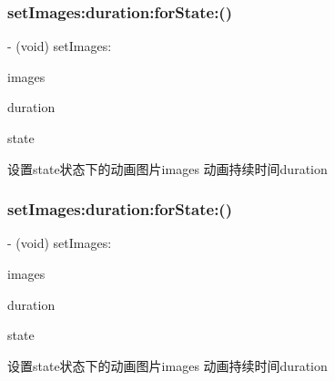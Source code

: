 \subsubsection{\texorpdfstring{set\+Images\+:duration\+:for\+State\+:()}{setImages:duration:forState:()}\hspace{0.1cm}{\footnotesize\ttfamily [1/3]}}
{\footnotesize\ttfamily -\/ (void) set\+Images\+: \begin{DoxyParamCaption}\item[{(N\+S\+Array $\ast$)}]{images }\item[{duration:(N\+S\+Time\+Interval)}]{duration }\item[{forState:(M\+J\+Refresh\+State)}]{state }\end{DoxyParamCaption}}

设置state状态下的动画图片images 动画持续时间duration \mbox{\label{interface_m_j_refresh_gif_header_a7e3e5adcc0096efd42868e99a54a068e}} 
\subsubsection{\texorpdfstring{set\+Images\+:duration\+:for\+State\+:()}{setImages:duration:forState:()}\hspace{0.1cm}{\footnotesize\ttfamily [2/3]}}
{\footnotesize\ttfamily -\/ (void) set\+Images\+: \begin{DoxyParamCaption}\item[{(N\+S\+Array $\ast$)}]{images }\item[{duration:(N\+S\+Time\+Interval)}]{duration }\item[{forState:(M\+J\+Refresh\+State)}]{state }\end{DoxyParamCaption}}

设置state状态下的动画图片images 动画持续时间duration \mbox{\label{interface_m_j_refresh_gif_header_a7e3e5adcc0096efd42868e99a54a068e}} 

